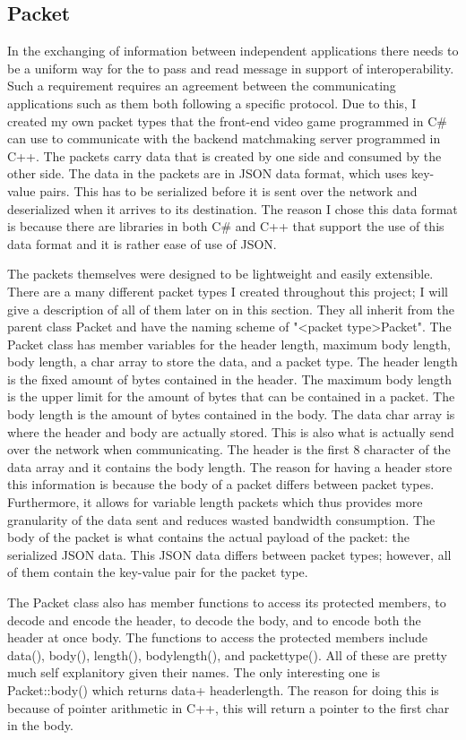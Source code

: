 \documentclass[conference]{IEEEtran}
\begin{document}
\subsection{Packet}
In the exchanging of information between independent applications there needs to be a uniform way for the to pass and read message in support of interoperability. 
Such a requirement requires an agreement between the communicating applications such as them both following a specific protocol.
Due to this, I created my own packet types that the front-end video game programmed in C# can use to communicate with the backend matchmaking server programmed in C++.  
The packets carry data that is created by one side and  consumed by the other side.
The data in the packets are in JSON data format, which uses key-value pairs.  
This has to be serialized before it is sent over the network and deserialized when it arrives to its destination.
The reason I chose this data format is because there are libraries in both C# and C++ that support the use of this data format and it is rather ease of use of JSON.

The packets themselves were designed to be lightweight and easily extensible.
There are a many different packet types I created throughout this project; I will give a description of all of them later on in this section.
They all inherit from the parent class Packet and have the naming scheme of "<packet type>Packet".
The Packet class has member variables for the header length, maximum body length, body length, a char array to store the data, and a packet type.
The header length is the fixed amount of bytes contained in the header.
The maximum body length is the upper limit for the amount of bytes that can be contained in  a packet.
The body length is the amount of bytes contained in the body.
The data char array is where the header and body are actually stored.
This is also what is actually send over the network when communicating.
The header is the first 8 character of the data array and it contains the body length.
The reason for having a header store this information is because the body of a packet differs between packet types.
Furthermore, it allows for variable length packets which thus provides more granularity of the data sent and reduces wasted bandwidth consumption.
The body of the packet is what contains the actual payload of the packet: the serialized JSON data.
This JSON data differs between packet types; however, all of them contain the key-value pair for the packet type.

The Packet class also has member functions to access its protected members, to decode and encode the header, to decode the body, and to encode both the header at once body.
The functions to access the protected members include data(), body(), length(), body\textunderscore length(), and packet\textunderscore type().
All of these are pretty much self explanitory given their names.
The only interesting one is Packet::body() which returns data\textunderscore + header\textunderscore length.
The reason for doing this is because of pointer arithmetic in C++, this will return a pointer to the first char in the body.
\end{document}
